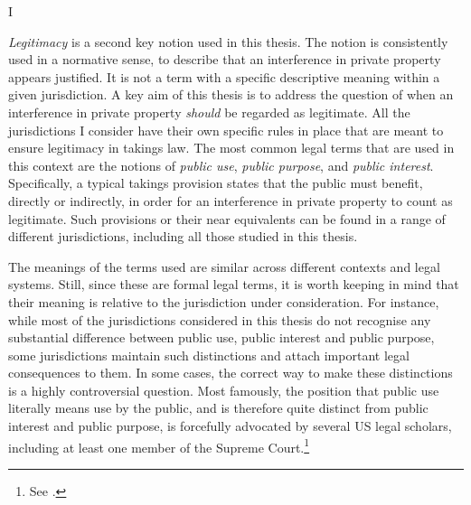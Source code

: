 {I%

{\it Legitimacy} is a second key notion used in this thesis. The notion is consistently used in a normative sense, to describe that an interference in private property appears justified. It is not a term with a specific descriptive meaning within a given jurisdiction. A key aim of this thesis is to address the question of when an interference in private property {\it should} be regarded as legitimate. All the jurisdictions I consider have their own specific rules in place that are meant to ensure legitimacy in takings law. The most common legal terms that are used in this context are the notions of {\it public use}, {\it public purpose}, and {\it public interest}. Specifically, a typical takings provision states that the public must benefit, directly or indirectly, in order for an interference in private property to count as legitimate. Such provisions or their near equivalents can be found in a range of different jurisdictions, including all those studied in this thesis.

The meanings of the terms used are similar across different contexts and legal systems. Still, since these are formal legal terms, it is worth keeping in mind that their meaning is relative to the jurisdiction under consideration. For instance, while most of the jurisdictions considered in this thesis do not recognise any substantial difference between public use, public interest and public purpose, some jurisdictions maintain such distinctions and attach important legal consequences to them. In some cases, the correct way to make these distinctions is a highly controversial question. Most famously, the position that public use literally means use by the public, and is therefore quite distinct from public interest and public purpose, is forcefully advocated by several US legal scholars, including at least one member of the Supreme Court.\footnote{See \cite{kelo05}.}

}
